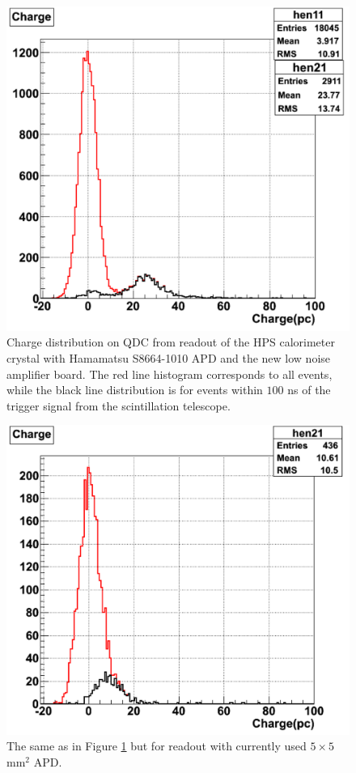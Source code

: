 \begin{figure}[t]
\includegraphics[scale=0.5]{ecal/MIP_10x10_APD.png}
\caption{\small{Charge distribution on QDC from readout of the HPS calorimeter crystal with Hamamatsu S8664-1010 APD and the new low noise amplifier board. The red line histogram corresponds to all events, while the black line distribution is for events within $100$ ns of the trigger signal from the scintillation telescope.}}\label{fig:mip10x10}
\end{figure}

\begin{figure}[t]
\includegraphics[scale=0.5]{ecal/MIP_5x5_APD.png}
\caption{\small{The same as in Figure \ref{fig:mip10x10} but for readout with currently used $5\times 5$ mm$^2$ APD.}}\label{fig:mip5x5}
\end{figure}
